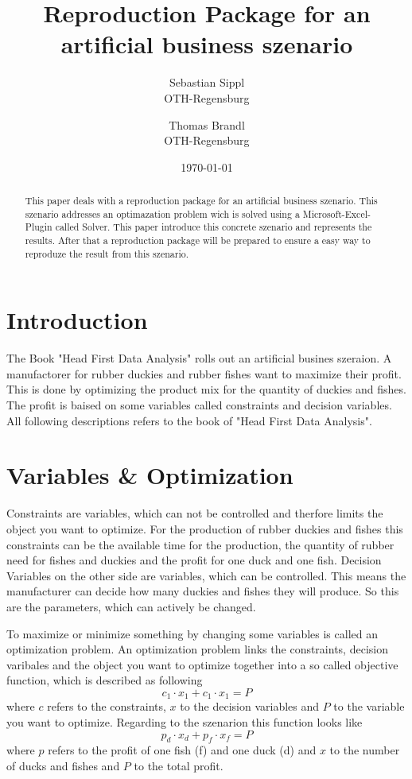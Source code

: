 \documentclass{article}
\title{\textbf{Reproduction Package for an artificial business szenario}}
\author{Sebastian Sippl  \\
	OTH-Regensburg  \\
	\and 
	Thomas Brandl \\
	OTH-Regensburg  \\
	}
\date{\today}
\begin{document}
\maketitle
\begin{abstract}
This paper deals with a reproduction package for an artificial business szenario. This szenario addresses an optimazation problem wich is solved using a Microsoft-Excel-Plugin called Solver. This paper introduce this concrete szenario and represents the results. After that a reproduction package will be prepared to ensure a easy way to reproduze the result from this szenario.
\end{abstract}

\begin{multicols}{2}

\section{Introduction}
The Book "Head First Data Analysis" \cite{micheal} rolls out an artificial busines szeraion. A manufactorer for rubber duckies and rubber fishes want to maximize their profit. This is done by optimizing the product mix for the quantity of duckies and fishes. The profit is baised on some variables called constraints and decision variables. All following descriptions refers to the book of "Head First Data Analysis".

\section{Variables \& Optimization}
Constraints are variables, which can not be controlled and therfore limits the object you want to optimize. For the production of rubber duckies and fishes this constraints can be the available time for the production, the quantity of rubber need for fishes and duckies and the profit for one duck and one fish. Decision Variables on the other side are variables, which can be controlled. This means the manufacturer can decide how many duckies and fishes they will produce. So this are the parameters, which can actively be changed. 

To maximize or minimize something by changing some variables is called an optimization problem. An optimization problem links the constraints, decision varibales and the object you want to optimize together into a so called objective function, which is described as following
\begin{equation}
c_{1}\cdot x_{1} + c_{1}\cdot x_{1} = P
\end{equation}
where $c$ refers to the constraints, $x$ to the decision variables and $P$ to the variable you want to optimize. Regarding to the szenarion this function looks like 
\begin{equation}
p_{d}\cdot x_{d} + p_{f}\cdot x_{f} = P
\end{equation}
where $p$ refers to the profit of one fish (f) and one duck (d) and $x$ to the number of ducks and fishes and $P$ to the total profit.


\end{multicols}
\end{document}
